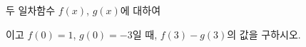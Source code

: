 두 일차함수 $f(x)$, $g(x)$에 대하여\par\smallskip{}\par\smallskip\noindent 이고 $f(0)=1$, $g(0)=-3$일 때, $f(3)-g(3)$의 값을 구하시오.
